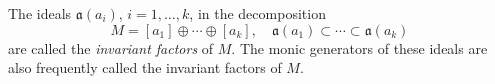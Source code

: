 The ideals $\mathfrak{a}(a_i)$, $i = 1, \ldots, k$, in the decomposition
$$M = [a_1] \oplus \cdots \oplus [a_k], \quad \mathfrak{a}(a_1) \subset \cdots \subset \mathfrak{a}(a_k)$$
are called the \emph{invariant factors} of $M$. The monic generators of these ideals are also frequently called the invariant factors of $M$.

